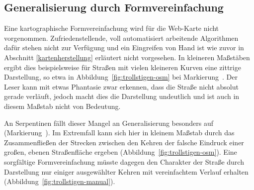 \documentclass[../main/thesis.tex]{subfiles}
\begin{document}
\subsection{Generalisierung durch Formvereinfachung}

Eine kartographische Formvereinfachung wird für die Web-Karte nicht vorgenommen.
Zufriedenstellende, voll automatisiert arbeitende Algorithmen dafür stehen nicht zur Verfügung und ein Eingreifen von Hand ist wie zuvor in Abschnitt \ref{kartenherstellung} erläutert nicht vorgesehen. 
In kleineren Maßstäben ergibt dies beispielsweise für Straßen mit vielen kleineren Kurven eine zittrige Darstellung, so etwa in Abbildung~\ref{fig:trollstigen-osm} bei Markierung~.
Der Leser kann mit etwas Phantasie zwar erkennen, dass die Straße nicht absolut gerade verläuft, jedoch macht dies die Darstellung undeutlich und ist auch in diesem Maßstab nicht von Bedeutung.


An Serpentinen fällt dieser Mangel an Generalisierung besonders auf (Markierung~).
Im Extremfall kann sich hier in kleinem Maßstab durch das Zusammenfließen der Strecken zwischen den Kehren der falsche Eindruck einer großen, ebenen Straßenfläche ergeben (Abbildung~\ref{fig:trollstigen-osm}).
Eine sorgfältige Formvereinfachung müsste dagegen den Charakter der Straße durch Darstellung nur einiger ausgewählter Kehren mit vereinfachtem Verlauf erhalten (Abbildung~\ref{fig:trollstigen-manual}).
\end{document}
